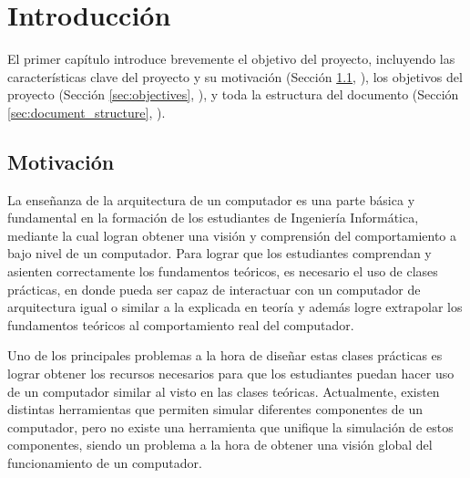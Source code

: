 \chead[]{}
\renewcommand{\headrulewidth}{0.5pt}

\lfoot[]{}
\cfoot[]{}
\rfoot[]{}
\renewcommand{\footrulewidth}{0pt}

\chapter{Introducción}
\label{ch:introduction}

El primer capítulo introduce brevemente el objetivo del proyecto, incluyendo las características clave del proyecto y su motivación (Sección \ref{sec:background_and_motivation}, \textit{}), los objetivos del proyecto (Sección \ref{sec:objectives}, \textit{}), y toda la estructura del documento (Sección \ref{sec:document_structure}, \textit{}).

\section{Motivación}
\label{sec:background_and_motivation}

La enseñanza de la arquitectura de un computador es una parte básica y fundamental en la formación de los estudiantes de Ingeniería Informática, mediante la cual logran obtener una visión y comprensión del comportamiento a bajo nivel de un computador. Para lograr que los estudiantes comprendan y asienten correctamente los fundamentos teóricos, es necesario el uso de clases prácticas, en donde pueda ser capaz de interactuar con un computador de arquitectura igual o similar a la explicada en teoría y además logre extrapolar los fundamentos teóricos al comportamiento real del computador.

Uno de los principales problemas a la hora de diseñar estas clases prácticas es lograr obtener los recursos necesarios para que los estudiantes puedan hacer uso de un computador similar al visto en las clases teóricas. Actualmente, existen distintas herramientas que permiten simular diferentes componentes de un computador, pero no existe una herramienta que unifique la simulación de estos componentes, siendo un problema a la hora de obtener una visión global del funcionamiento de un computador.

